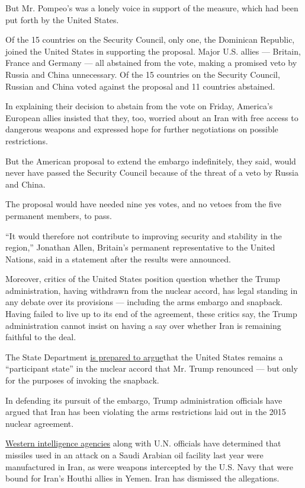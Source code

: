 But Mr. Pompeo's was a lonely voice in support of the measure, which had
been put forth by the United States.

Of the 15 countries on the Security Council, only one, the Dominican
Republic, joined the United States in supporting the proposal. Major
U.S. allies --- Britain, France and Germany --- all abstained from the
vote, making a promised veto by Russia and China unnecessary. Of the 15
countries on the Security Council, Russian and China voted against the
proposal and 11 countries abstained.

In explaining their decision to abstain from the vote on Friday,
America's European allies insisted that they, too, worried about an Iran
with free access to dangerous weapons and expressed hope for further
negotiations on possible restrictions.

But the American proposal to extend the embargo indefinitely, they said,
would never have passed the Security Council because of the threat of a
veto by Russia and China.

The proposal would have needed nine yes votes, and no vetoes from the
five permanent members, to pass.

``It would therefore not contribute to improving security and stability
in the region,'' Jonathan Allen, Britain's permanent representative to
the United Nations, said in a statement after the results were
announced.

Moreover, critics of the United States position question whether the
Trump administration, having withdrawn from the nuclear accord, has
legal standing in any debate over its provisions --- including the arms
embargo and snapback. Having failed to live up to its end of the
agreement, these critics say, the Trump administration cannot insist on
having a say over whether Iran is remaining faithful to the deal.

The State Department
\href{https://www.nytimes3xbfgragh.onion/2020/04/26/world/middleeast/us-iran-nuclear-deal-pompeo.html}{is
prepared to argue}that the United States remains a ``participant state''
in the nuclear accord that Mr. Trump renounced --- but only for the
purposes of invoking the snapback.

In defending its pursuit of the embargo, Trump administration officials
have argued that Iran has been violating the arms restrictions laid out
in the 2015 nuclear agreement.

\href{https://www.nytimes3xbfgragh.onion/interactive/2019/09/16/world/middleeast/trump-saudi-arabia-oil-attack.html}{Western
intelligence agencies} along with U.N. officials have determined that
missiles used in an attack on a Saudi Arabian oil facility last year
were manufactured in Iran, as were weapons intercepted by the U.S. Navy
that were bound for Iran's Houthi allies in Yemen. Iran has dismissed
the allegations.


